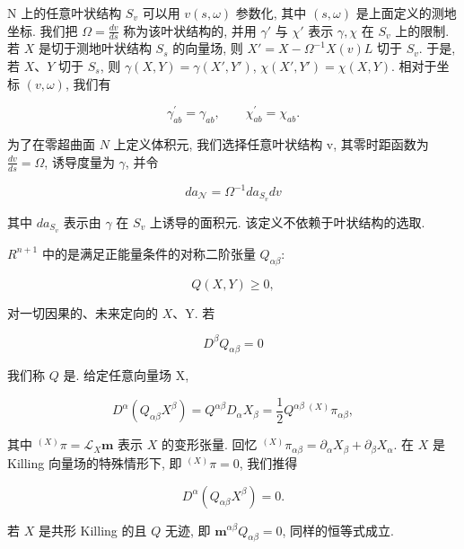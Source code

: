 N 上的任意叶状结构 $S_{v}$ 可以用 $v(s, \omega)$ 参数化, 其中 $(s, \omega)$ 是上面定义的测地坐标. 我们把 $\Omega = \frac{dv}{ds}$ 称为该叶状结构的, 并用 $\gamma'$ 与 $\chi'$ 表示 $\gamma, \chi$ 在 $S_{v}$ 上的限制. 若 $X$ 是切于测地叶状结构 $S_{s}$ 的向量场, 则 $X' = X - \Omega^{-1}X(v)L$ 切于 $S_{v}$. 于是, 若 $X$、$Y$ 切于 $S_{s}$, 则 $\gamma(X, Y) = \gamma(X', Y')$, $\chi(X', Y') = \chi(X, Y)$. 相对于坐标 $(v, \omega)$, 我们有

\[
\gamma_{ab}^{\prime} = \gamma_{ab}, \qquad \chi_{ab}^{\prime} = \chi_{ab}.
\]

为了在零超曲面 $N$ 上定义体积元, 我们选择任意叶状结构 v, 其零时距函数为 $\frac{dv}{ds} = \Omega$, 诱导度量为 $\gamma$, 并令

\begin{equation}
da_{\mathcal{N}} = \Omega^{-1}da_{S_{v}}dv\label{eq:cA-441}
\end{equation}

其中 $da_{S_{v}}$ 表示由 $\gamma$ 在 $S_{v}$ 上诱导的面积元. 该定义不依赖于叶状结构的选取.


$R^{n+1}$ 中的是满足正能量条件的对称二阶张量 $Q_{\alpha\beta}$:

\[
Q(X, Y) \geq 0,
\]

对一切因果的、未来定向的 $X$、Y. 若

\begin{equation}
D^{\beta}Q_{\alpha\beta} = 0\label{eq:cA-442}
\end{equation}

我们称 $Q$ 是. 给定任意向量场 X,

\[
D^{\alpha}(Q_{\alpha\beta}X^{\beta}) = Q^{\alpha\beta}D_{\alpha}X_{\beta} = \frac{1}{2}Q^{\alpha\beta}\, {}^{(X)}\pi_{\alpha\beta},
\]

其中 ${}^{(X)}\pi = \mathcal{L}_{X}\mathbf{m}$ 表示 $X$ 的变形张量. 回忆 ${}^{(X)}\pi_{\alpha\beta} = \partial_{\alpha}X_{\beta} + \partial_{\beta}X_{\alpha}$. 在 $X$ 是 Killing 向量场的特殊情形下, 即 ${}^{(X)}\pi = 0$, 我们推得

\begin{equation}
D^{\alpha}(Q_{\alpha\beta}X^{\beta}) = 0.\label{eq:cA-443}
\end{equation}

若 $X$ 是共形 Killing 的且 $Q$ 无迹, 即 $\mathbf{m}^{\alpha\beta}Q_{\alpha\beta} = 0$, 同样的恒等式成立.


